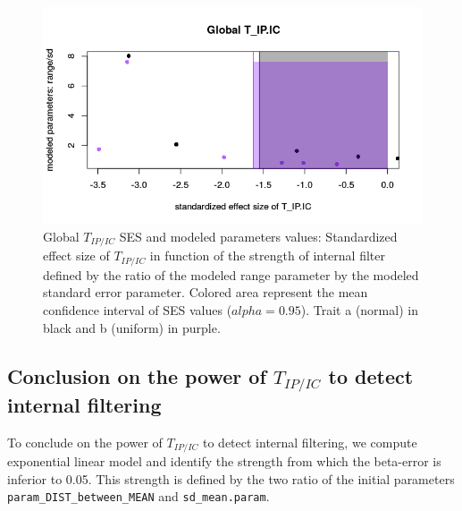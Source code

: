 \documentclass[12pt]{article}\usepackage[]{graphicx}\usepackage[]{color}
\makeatletter
\def\maxwidth{ %
  \ifdim\Gin@nat@width>\linewidth
    \linewidth
  \else
    \Gin@nat@width
  \fi
}
\newenvironment{knitrout}{}{} %
\makeatother
\begin{document}
\begin{knitrout}
\begin{figure}
{\centering \includegraphics[width=\maxwidth]{figure/Internal_filter_Results_plots_modeled_param-1} 

}

\caption[Global $T_{IP/IC}$ SES and modeled parameters values]{Global $T_{IP/IC}$ SES and modeled parameters values: Standardized effect size of $T_{IP/IC}$ in function of the strength of internal filter defined by the ratio of the modeled range parameter by the modeled standard error parameter. Colored area represent the mean confidence interval of SES values ($alpha = 0.95$). Trait a (normal) in black and b (uniform) in purple.}\label{fig:Internal_filter_Results_plots_modeled_param}
\end{figure}


\end{knitrout}

  \subsection {Conclusion on the power of $T_{IP/IC}$ to detect internal filtering}

To conclude on the power of $T_{IP/IC}$ to detect internal filtering, we compute exponential linear model and identify the strength from which the beta-error is inferior to 0.05. This strength is defined by the two ratio of the initial parameters \texttt{param\_DIST\_between\_MEAN} and \texttt{sd\_mean.param}. 
\end{document}
